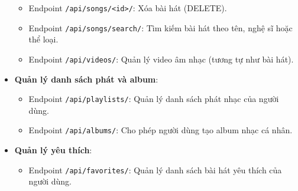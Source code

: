 \begin{itemize}
\begin{itemize}
        \item Endpoint \texttt{/api/songs/<id>/}: Xóa bài hát (DELETE).
        \item Endpoint \texttt{/api/songs/search/}: Tìm kiếm bài hát theo tên, nghệ sĩ hoặc thể loại.
        \item Endpoint \texttt{/api/videos/}: Quản lý video âm nhạc (tương tự như bài hát).
    \end{itemize}
    \item \textbf{Quản lý danh sách phát và album}:
    \begin{itemize}
        \item Endpoint \texttt{/api/playlists/}: Quản lý danh sách phát nhạc của người dùng.
        \item Endpoint \texttt{/api/albums/}: Cho phép người dùng tạo album nhạc cá nhân.
    \end{itemize}
    \item \textbf{Quản lý yêu thích}:
    \begin{itemize}
        \item Endpoint \texttt{/api/favorites/}: Quản lý danh sách bài hát yêu thích của người dùng.
    \end{itemize}
\end{itemize}

